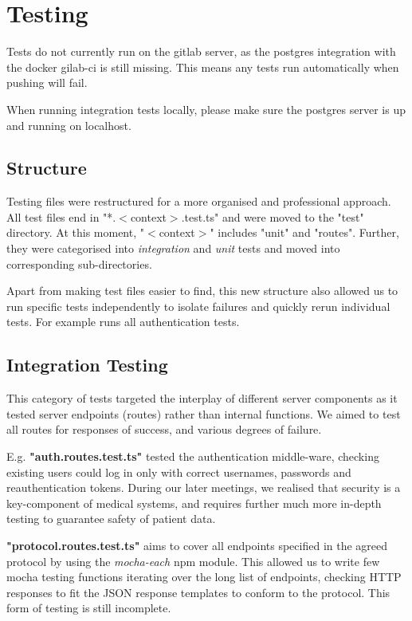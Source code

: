 \section{Testing}
Tests do not currently run on the gitlab server, as the postgres integration with the docker gilab-ci is still missing. This means any tests run automatically when pushing will fail. \par
When running integration tests locally, please make sure the postgres server is up and running on localhost. 
\subsection{Structure}
Testing files were restructured for a more organised and professional approach. All test files end in "*.\(<\)context\(>\).test.ts" and were moved to the "test" directory. At this moment, "\(<\)context\(>\)" includes "unit" and "routes". Further, they were categorised into \textit{integration} and \textit{unit} tests and moved into corresponding sub-directories.  \par
Apart from making test files easier to find, this new structure also allowed us to run specific tests independently to isolate failures and quickly rerun individual tests. For example  runs all authentication tests. 
\subsection{Integration Testing}
This category of tests targeted the interplay of different server components as it tested server endpoints (routes) rather than internal functions. We aimed to test all routes for responses of success, and various degrees of failure. \par
E.g. \textbf{"auth.routes.test.ts"} tested the authentication middle-ware, checking existing users could log in only with correct usernames, passwords and reauthentication tokens. During our later meetings, we realised that security is a key-component of medical systems, and requires further much more in-depth testing to guarantee safety of patient data. \par
\textbf{"protocol.routes.test.ts"} aims to cover all endpoints specified in the agreed protocol by using the \textit{mocha-each} npm module. This allowed us to write few mocha testing functions iterating over the long list of endpoints, checking HTTP responses to fit the JSON response templates to conform to the protocol. This form of testing is still incomplete. 
